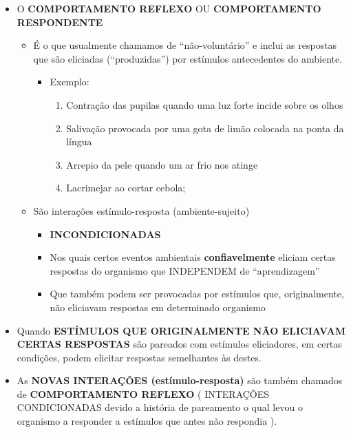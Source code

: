 \documentclass[
]{book}
\providecommand{\tightlist}{%
  \setlength{\itemsep}{0pt}\setlength{\parskip}{0pt}}
\begin{document}
\begin{itemize}
\tightlist
\item
  O \textbf{COMPORTAMENTO REFLEXO} OU \textbf{COMPORTAMENTO RESPONDENTE}

  \begin{itemize}
  \tightlist
  \item
    É o que usualmente chamamos de ``não-voluntário'' e inclui as respostas que são eliciadas (``produzidas'') por estímulos antecedentes do ambiente.

    \begin{itemize}
    \tightlist
    \item
      Exemplo:

      \begin{enumerate}
      \def\labelenumi{\alph{enumi}.}
      \tightlist
      \item
        Contração das pupilas quando uma luz forte incide sobre os olhos
      \item
        Salivação provocada por uma gota de limão colocada na ponta da língua
      \item
        Arrepio da pele quando um ar frio nos atinge
      \item
        Lacrimejar ao cortar cebola;
      \end{enumerate}
    \end{itemize}
  \item
    São interações estímulo-resposta (ambiente-sujeito)

    \begin{itemize}
    \tightlist
    \item
      \textbf{INCONDICIONADAS}
    \item
      Nos quais certos eventos ambientais \textbf{confiavelmente} eliciam certas respostas do organismo que INDEPENDEM de ``aprendizagem''
    \item
      Que também podem ser provocadas por estímulos que, originalmente, não eliciavam respostas em determinado organismo
    \end{itemize}
  \end{itemize}
\item
  Quando \textbf{ESTÍMULOS QUE ORIGINALMENTE NÃO ELICIAVAM CERTAS RESPOSTAS} são pareados com estímulos eliciadores, em certas condições, podem elicitar respostas semelhantes às destes.
\item
  As \textbf{NOVAS INTERAÇÕES (estímulo-resposta)} são também chamados de \textbf{COMPORTAMENTO REFLEXO} ( INTERAÇÕES CONDICIONADAS devido a história de pareamento o qual levou o organismo a responder a estímulos que antes não respondia ).


\end{itemize}
\end{document}
